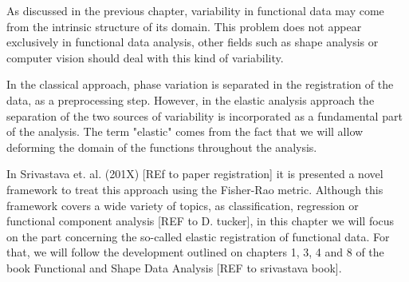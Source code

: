 As discussed in the previous chapter, variability in functional data may come
from the intrinsic structure of its domain. This problem does not appear
exclusively in functional data analysis, other fields such as shape analysis or
computer vision should deal with this kind of variability.

In the classical approach, phase variation is separated in the registration of
the data, as a preprocessing step. However, in the elastic analysis approach the
separation of the two sources of variability is incorporated as a fundamental
part of the analysis. The term "elastic" comes from the fact that we will allow
deforming the domain of the functions throughout the analysis.

In Srivastava et. al. (201X) [REf to paper registration] it is presented a novel
framework to treat this approach using the Fisher-Rao metric. Although this
framework covers a wide variety of topics, as classification, regression or
functional component analysis [REF to D. tucker], in this chapter we will focus
on the part concerning the so-called elastic registration of functional data.
For that, we will follow the development outlined on chapters 1, 3, 4 and 8 of 
the book Functional and Shape Data Analysis [REF to srivastava book].
